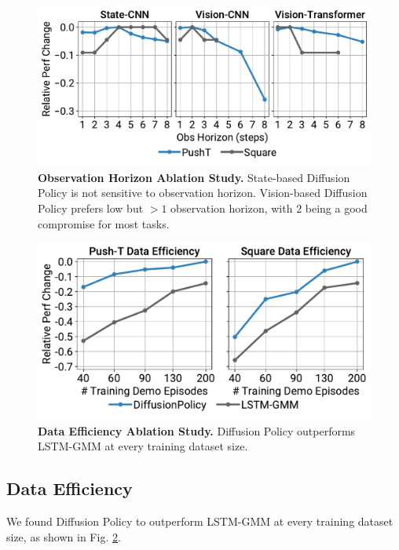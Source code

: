 \begin{figure}
\centering
\includegraphics[width=\linewidth]{figure/obs_horizon_figure.pdf}

\vspace{-2mm}
\caption{
\textbf{Observation Horizon Ablation Study.}
\label{fig:obs_horizon_ablation}
State-based Diffusion Policy is not sensitive to observation horizon.
Vision-based Diffusion Policy prefers low but $>1$ observation horizon, with $2$ being a good compromise for most tasks.
}
\vspace{-3mm}
\end{figure}

\begin{figure}
\centering
\includegraphics[width=\linewidth]{figure/sample_efficiency_figure.pdf}

\vspace{-2mm}
\caption{
\textbf{Data Efficiency Ablation Study.}
\label{fig:data_efficiency}
Diffusion Policy outperforms LSTM-GMM \cite{robomimic} at every training dataset size.
}
\vspace{-5mm}
\end{figure}

\subsection{Data Efficiency}
We found Diffusion Policy to outperform LSTM-GMM \cite{robomimic} at every training dataset size, as shown in Fig. \ref{fig:data_efficiency}.

